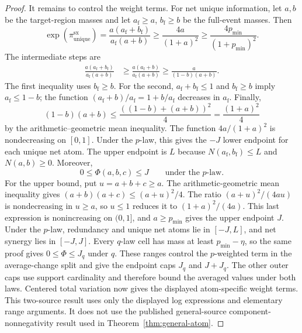 \documentclass[11pt]{article}
\theoremstyle{definition}
\newcommand{\sx}{\mathrm{sx}}
\begin{document}
\begin{proof}
It remains to control the weight terms.  For net unique information, let $a,b$ be the
target-region masses and let $a_{\mathrm f}\ge a$, $b_{\mathrm f}\ge b$ be the full-event masses.
	Then
	\begin{equation}
	  \exp(\pi_{\mathrm{unique}}^\sx)
  =
  \frac{a(a_{\mathrm f}+b_{\mathrm f})}{a_{\mathrm f}(a+b)}
  \ge
  \frac{4a}{(1+a)^2}
	  \ge
	  \frac{4p_{\min}}{(1+p_{\min})^2}.
	\end{equation}
	The intermediate steps are
	\begin{align}
	  \frac{a(a_{\mathrm f}+b_{\mathrm f})}{a_{\mathrm f}(a+b)}
	  &\ge
	  \frac{a(a_{\mathrm f}+b)}{a_{\mathrm f}(a+b)}
	  \ge
	  \frac{a}{(1-b)(a+b)}.
	\end{align}
	The first inequality uses $b_{\mathrm f}\ge b$.  For the second,
	$a_{\mathrm f}+b_{\mathrm f}\le1$ and $b_{\mathrm f}\ge b$ imply
	$a_{\mathrm f}\le1-b$; the function
	$(a_{\mathrm f}+b)/a_{\mathrm f}=1+b/a_{\mathrm f}$ decreases in $a_{\mathrm f}$.  Finally,
	\[
	  (1-b)(a+b)
	  \le
	  \frac{((1-b)+(a+b))^2}{4}
	  =
	  \frac{(1+a)^2}{4}
	\]
	by the arithmetic--geometric mean inequality.  The function $4a/(1+a)^2$ is nondecreasing on
	$[0,1]$.  Under the $p$-law, this gives the $-J$ lower endpoint for each unique
	net atom.  The upper endpoint is $L$ because
	$N(a_{\mathrm f},b_{\mathrm f})\le L$ and $N(a,b)\ge0$.
Moreover,
\begin{equation}\label{eq:diamond-range}
  0\le\Phi(a,b,c)\le J
  \qquad\text{under the $p$-law}.
\end{equation}
For the upper bound, put $u=a+b+c\ge a$.  The arithmetic-geometric mean inequality gives
	$(a+b)(a+c)\le(a+u)^2/4$.  The ratio $(a+u)^2/(4au)$ is nondecreasing in $u\ge a$, so $u\le1$
	reduces it to $(1+a)^2/(4a)$.  This last expression is nonincreasing on $(0,1]$, and
	$a\ge p_{\min}$ gives the upper endpoint $J$.
Under the $p$-law, redundancy and unique net atoms lie in $[-J,L]$, and net synergy lies in
$[-J,J]$.  Every $q$-law cell has mass at least $p_{\min}-\eta$, so the same proof gives
$0\le\Phi\le J_q$ under $q$.  These ranges control the $p$-weighted term in the average-change
split and give the endpoint caps $J_q$ and $J+J_q$.  The other outer caps use support cardinality
and therefore bound the averaged values under both laws.  Centered total variation now gives the
displayed atom-specific weight terms.
This two-source result uses only the displayed log expressions and elementary range arguments.  It
does not use the published general-source component-nonnegativity result used in
Theorem~\ref{thm:general-atom}.
\end{proof}
\end{document}
